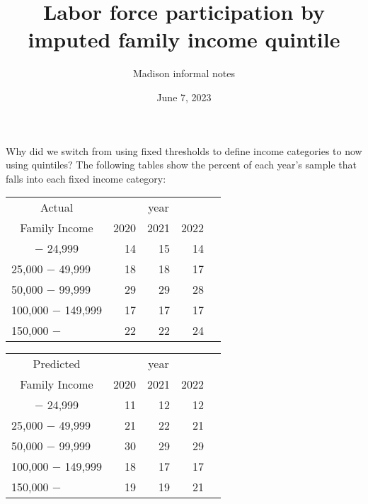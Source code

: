 \documentclass{article}
\title{Labor force participation by imputed family income quintile}
\author{Madison informal notes}
\date{June 7, 2023}
\begin{document}
	\maketitle
	
	
	Why did we switch from using fixed thresholds to define income categories to now using quintiles? 
	The following tables show the percent of each year's sample that falls into each fixed income category: 
	
	\begin{minipage}[b]{.40\textwidth}
		\centering
	\begin{tabular}{lllll}
		\cline{1-4}
		\multicolumn{1}{c}{Actual} &
		\multicolumn{3}{|c}{year} \\
		\multicolumn{1}{c}{Family Income} &
		\multicolumn{1}{|r}{2020} &
		\multicolumn{1}{r}{2021} &
		\multicolumn{1}{r}{2022}  \\
		\cline{1-4}
		\multicolumn{1}{c}{$-$ 24,999} &
		\multicolumn{1}{|r}{14} &
		\multicolumn{1}{r}{15} &
		\multicolumn{1}{r}{14} \\
		\multicolumn{1}{l}{25,000 $-$ 49,999} &
		\multicolumn{1}{|r}{18} &
		\multicolumn{1}{r}{18} &
		\multicolumn{1}{r}{17} \\
		\multicolumn{1}{l}{50,000 $-$ 99,999} &
		\multicolumn{1}{|r}{29} &
		\multicolumn{1}{r}{29} &
		\multicolumn{1}{r}{28}  \\
		\multicolumn{1}{l}{100,000 $-$ 149,999} &
		\multicolumn{1}{|r}{17} &
		\multicolumn{1}{r}{17} &
		\multicolumn{1}{r}{17} \\
		\multicolumn{1}{l}{150,000 $-$} &
		\multicolumn{1}{|r}{22} &
		\multicolumn{1}{r}{22} &
		\multicolumn{1}{r}{24} \\
		\cline{1-4}
	\end{tabular}
	\end{minipage}\qquad
	\begin{minipage}[b]{.40\textwidth}
		\centering
		\begin{tabular}{lllll}
			\cline{1-4}
			\multicolumn{1}{c}{Predicted} &
			\multicolumn{3}{|c}{year} \\
			\multicolumn{1}{c}{Family Income} &
			\multicolumn{1}{|r}{2020} &
			\multicolumn{1}{r}{2021} &
			\multicolumn{1}{r}{2022} \\
			\cline{1-4}
			\multicolumn{1}{c}{$-$ 24,999} &
			\multicolumn{1}{|r}{11} &
			\multicolumn{1}{r}{12} &
			\multicolumn{1}{r}{12} \\
			\multicolumn{1}{l}{25,000 $-$ 49,999} &
			\multicolumn{1}{|r}{21} &
			\multicolumn{1}{r}{22} &
			\multicolumn{1}{r}{21} \\
			\multicolumn{1}{l}{50,000 $-$ 99,999} &
			\multicolumn{1}{|r}{30} &
			\multicolumn{1}{r}{29} &
			\multicolumn{1}{r}{29} \\
			\multicolumn{1}{l}{100,000 $-$ 149,999} &
			\multicolumn{1}{|r}{18} &
			\multicolumn{1}{r}{17} &
			\multicolumn{1}{r}{17} \\
			\multicolumn{1}{l}{150,000 $-$} &
			\multicolumn{1}{|r}{19} &
			\multicolumn{1}{r}{19} &
			\multicolumn{1}{r}{21} \\
			\cline{1-4}
		\end{tabular}
		\end{minipage}
	
\end{document}
